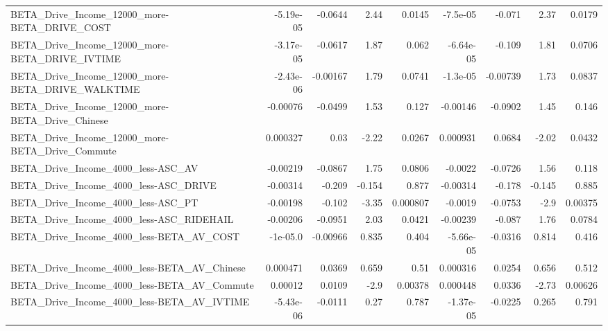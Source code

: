 \begin{tabular}{lrrrrrrrr}
BETA\_Drive\_Income\_12000\_more-BETA\_DRIVE\_COST       &   -5.19e-05 &      -0.0644 &     2.44 &   0.0145 &   -7.5e-05 &      -0.071 &         2.37 &        0.0179 \\
BETA\_Drive\_Income\_12000\_more-BETA\_DRIVE\_IVTIME     &   -3.17e-05 &      -0.0617 &     1.87 &    0.062 &  -6.64e-05 &      -0.109 &         1.81 &        0.0706 \\
BETA\_Drive\_Income\_12000\_more-BETA\_DRIVE\_WALKTIME   &   -2.43e-06 &     -0.00167 &     1.79 &   0.0741 &   -1.3e-05 &    -0.00739 &         1.73 &        0.0837 \\
BETA\_Drive\_Income\_12000\_more-BETA\_Drive\_Chinese    &    -0.00076 &      -0.0499 &     1.53 &    0.127 &   -0.00146 &     -0.0902 &         1.45 &         0.146 \\
BETA\_Drive\_Income\_12000\_more-BETA\_Drive\_Commute    &    0.000327 &         0.03 &    -2.22 &   0.0267 &   0.000931 &      0.0684 &        -2.02 &        0.0432 \\
BETA\_Drive\_Income\_4000\_less-ASC\_AV                 &    -0.00219 &      -0.0867 &     1.75 &   0.0806 &    -0.0022 &     -0.0726 &         1.56 &         0.118 \\
BETA\_Drive\_Income\_4000\_less-ASC\_DRIVE              &    -0.00314 &       -0.209 &   -0.154 &    0.877 &   -0.00314 &      -0.178 &       -0.145 &         0.885 \\
BETA\_Drive\_Income\_4000\_less-ASC\_PT                 &    -0.00198 &       -0.102 &    -3.35 & 0.000807 &    -0.0019 &     -0.0753 &         -2.9 &       0.00375 \\
BETA\_Drive\_Income\_4000\_less-ASC\_RIDEHAIL           &    -0.00206 &      -0.0951 &     2.03 &   0.0421 &   -0.00239 &      -0.087 &         1.76 &        0.0784 \\
BETA\_Drive\_Income\_4000\_less-BETA\_AV\_COST           &    -1e-05.0 &     -0.00966 &    0.835 &    0.404 &  -5.66e-05 &     -0.0316 &        0.814 &         0.416 \\
BETA\_Drive\_Income\_4000\_less-BETA\_AV\_Chinese        &    0.000471 &       0.0369 &    0.659 &     0.51 &   0.000316 &      0.0254 &        0.656 &         0.512 \\
BETA\_Drive\_Income\_4000\_less-BETA\_AV\_Commute        &     0.00012 &       0.0109 &     -2.9 &  0.00378 &   0.000448 &      0.0336 &        -2.73 &       0.00626 \\
BETA\_Drive\_Income\_4000\_less-BETA\_AV\_IVTIME         &   -5.43e-06 &      -0.0111 &     0.27 &    0.787 &  -1.37e-05 &     -0.0225 &        0.265 &         0.791 \\

\end{tabular}
